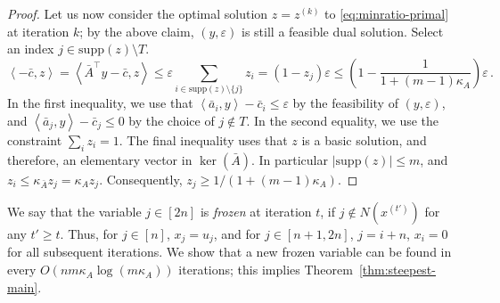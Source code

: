\documentclass[11pt, a4paper]{article}
\newcommand{\pr}[2]{\left\langle #1, #2 \right\rangle}
\newcommand{\supp}{\mathrm{supp}}
\newcommand{\1}{\mathbbm{1}}
\theoremstyle{case}
\begin{document}
\begin{proof}
Let us now consider the optimal solution  $z=z^{(k)}$ to \eqref{eq:minratio-primal} at iteration $k$; by the above claim, $(y,\varepsilon)$ is still a feasible dual solution. Select an index  $j\in \supp(z)\setminus T$.
\[
\pr{-\bar c}{z}=\pr{\bar A^\top y - \bar c} z \le \varepsilon \sum_{i\in \supp(z)\setminus \{j\}} z_i = (1-z_j)  \varepsilon \le 
\left(1-\frac{1}{1+(m-1)\kappa_A}\right) \varepsilon\, .
\]
In the first inequality, we use that $\pr{\bar a_i}{y} - \bar c_i \le \varepsilon$ by the feasibility of $(y,\varepsilon)$, and $\pr{\bar a_j}{y} - \bar c_j \le 0$ by the choice of $j\notin T$. In the second equality, we use 
the constraint $\sum_i z_i=1$. The final inequality uses that
 $z$ is a basic solution, and therefore, an elementary vector in $\ker(\bar A)$. In particular $|\supp(z)|\le m$, and $z_i\le \kappa_{\bar A} z_j= \kappa_{A} z_j$. Consequently, $z_j\ge 1/(1+(m-1)\kappa_A)$.
\end{proof}

We say that the variable $j\in [2n]$ is \emph{frozen} at iteration $t$, if $j\notin N(x^{(t')})$ for any $t'\ge t$. Thus, for $j\in [n]$, $x_j=u_j$, and for $j\in [n+1,2n]$, $j=i+n$, $x_i=0$ for all subsequent iterations. We show that a new frozen variable can be found in every $O(nm\kappa_A\log(m\kappa_A))$ iterations; this implies
Theorem~\ref{thm:steepest-main}.
\end{document}
